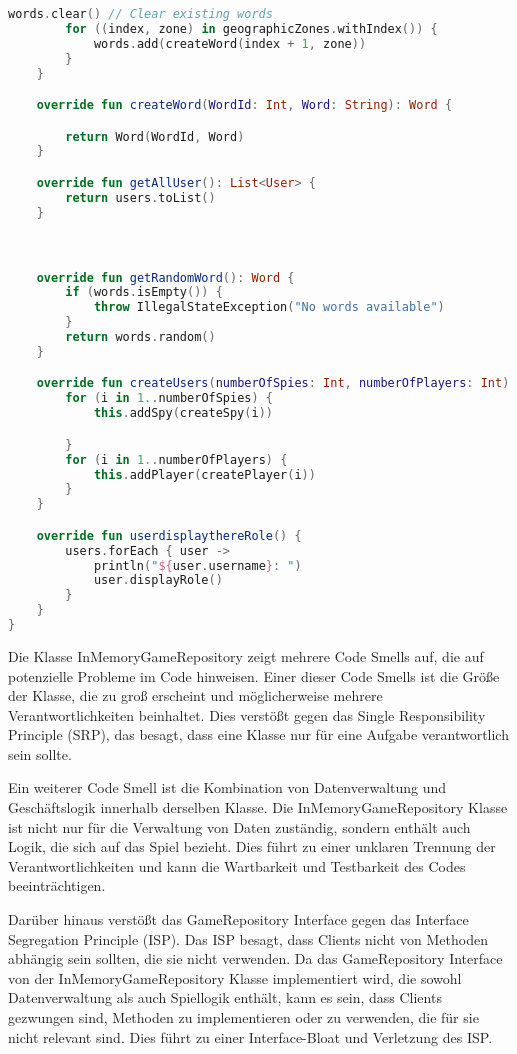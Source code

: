 \begin{lstlisting}[language=Kotlin, caption={Code Smell: Large Class and Long Method}, label={lst:5}]
        words.clear() // Clear existing words
        for ((index, zone) in geographicZones.withIndex()) {
            words.add(createWord(index + 1, zone))
        }
    }

    override fun createWord(WordId: Int, Word: String): Word {

        return Word(WordId, Word)
    }

    override fun getAllUser(): List<User> {
        return users.toList()
    }



    override fun getRandomWord(): Word {
        if (words.isEmpty()) {
            throw IllegalStateException("No words available")
        }
        return words.random()
    }

    override fun createUsers(numberOfSpies: Int, numberOfPlayers: Int) {
        for (i in 1..numberOfSpies) {
            this.addSpy(createSpy(i))

        }
        for (i in 1..numberOfPlayers) {
            this.addPlayer(createPlayer(i))
        }
    }

    override fun userdisplaythereRole() {
        users.forEach { user ->
            println("${user.username}: ")
            user.displayRole()
        }
    }
}
\end{lstlisting}

Die Klasse InMemoryGameRepository zeigt mehrere Code Smells auf, die auf potenzielle Probleme im Code hinweisen. Einer dieser Code Smells ist die Größe der Klasse, die zu groß erscheint und möglicherweise mehrere Verantwortlichkeiten beinhaltet. Dies verstößt gegen das Single Responsibility Principle (SRP), das besagt, dass eine Klasse nur für eine Aufgabe verantwortlich sein sollte.

Ein weiterer Code Smell ist die Kombination von Datenverwaltung und Geschäftslogik innerhalb derselben Klasse. Die InMemoryGameRepository Klasse ist nicht nur für die Verwaltung von Daten zuständig, sondern enthält auch Logik, die sich auf das Spiel bezieht. Dies führt zu einer unklaren Trennung der Verantwortlichkeiten und kann die Wartbarkeit und Testbarkeit des Codes beeinträchtigen.

Darüber hinaus verstößt das GameRepository Interface gegen das Interface Segregation Principle (ISP). Das ISP besagt, dass Clients nicht von Methoden abhängig sein sollten, die sie nicht verwenden. Da das GameRepository Interface von der InMemoryGameRepository Klasse implementiert wird, die sowohl Datenverwaltung als auch Spiellogik enthält, kann es sein, dass Clients gezwungen sind, Methoden zu implementieren oder zu verwenden, die für sie nicht relevant sind. Dies führt zu einer Interface-Bloat und Verletzung des ISP.


